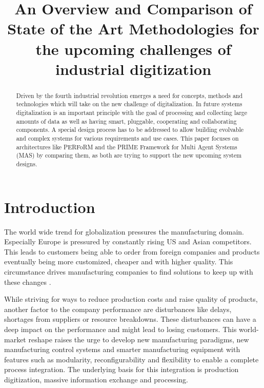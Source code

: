 \documentclass[conference,compsoc,hidelinks]{IEEEtran}
\begin{document}
\title{An Overview and Comparison of State of the Art Methodologies for the upcoming challenges of industrial digitization}

\author{
}

\maketitle

\begin{abstract}
Driven by the fourth industrial revolution emerges a need for concepts, methods and technologies which will take on the new challenge of digitalization. In future systems digitalization is an important principle with the goal of processing and collecting large amounts of data as well as having smart, pluggable, cooperating and collaborating components. A special design process has to be addressed to allow building evolvable and complex systems for various requirements and use cases. This paper focuses on architectures like PERFoRM and the PRIME Framework for Multi Agent Systems (MAS) by comparing them, as both are trying to support the new upcoming system designs.
\end{abstract}

\section{Introduction} %
The world wide trend for globalization pressures the manufacturing domain. Especially Europe is pressured by constantly rising US and Asian competitors. This leads to customers being able to order from foreign companies and products eventually being more customized, cheaper and with higher quality. This circumstance drives manufacturing companies to find solutions to keep up with these changes \cite{HarmonizedSystems}. 

While striving for ways to reduce production costs and raise quality of products, another factor to the company performance are disturbances like delays, shortages from suppliers or resource breakdowns. These disturbances can have a deep impact on the performance and might lead to losing customers. This world-market reshape raises the urge to develop new manufacturing paradigms, new manufacturing control systems and smarter manufacturing equipment with features such as modularity, reconfigurability and flexibility to enable a complete process integration. The underlying basis for this integration is production digitization, massive information exchange and processing. 
\end{document}
